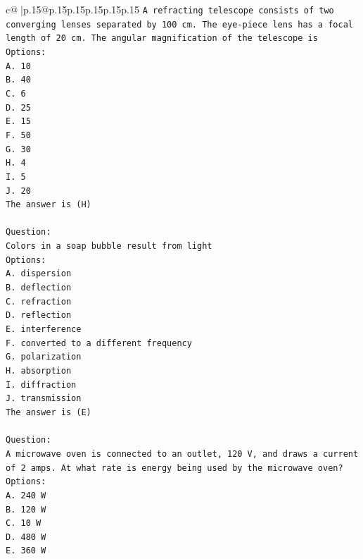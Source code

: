 \documentclass{article}
\begin{document}
{\begin{supertabular}{c@{$\;$}|p{.15\linewidth}@{}p{.15\linewidth}p{.15\linewidth}p{.15\linewidth}p{.15\linewidth}p{.15\linewidth}}
{{{\texttt{A refracting telescope consists of two converging lenses separated by 100 cm. The eye{-}piece lens has a focal length of 20 cm. The angular magnification of the telescope is} \\
\texttt{Options:} \\
\texttt{A. 10} \\
\texttt{B. 40} \\
\texttt{C. 6} \\
\texttt{D. 25} \\
\texttt{E. 15} \\
\texttt{F. 50} \\
\texttt{G. 30} \\
\texttt{H. 4} \\
\texttt{I. 5} \\
\texttt{J. 20} \\
\texttt{The answer is (H)} \\
\\ 
\texttt{Question:} \\
\texttt{Colors in a soap bubble result from light} \\
\texttt{Options:} \\
\texttt{A. dispersion} \\
\texttt{B. deflection} \\
\texttt{C. refraction} \\
\texttt{D. reflection} \\
\texttt{E. interference} \\
\texttt{F. converted to a different frequency} \\
\texttt{G. polarization} \\
\texttt{H. absorption} \\
\texttt{I. diffraction} \\
\texttt{J. transmission} \\
\texttt{The answer is (E)} \\
\\ 
\texttt{Question:} \\
\texttt{A microwave oven is connected to an outlet, 120 V, and draws a current of 2 amps. At what rate is energy being used by the microwave oven?} \\
\texttt{Options:} \\
\texttt{A. 240 W} \\
\texttt{B. 120 W} \\
\texttt{C. 10 W} \\
\texttt{D. 480 W} \\
\texttt{E. 360 W} \\
}}}
\end{supertabular}}
\end{document}
